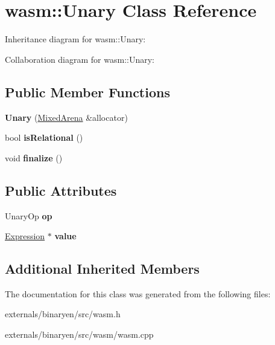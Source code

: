\hypertarget{classwasm_1_1_unary}{}\section{wasm\+:\+:Unary Class Reference}
\label{classwasm_1_1_unary}


Inheritance diagram for wasm\+:\+:Unary\+:


Collaboration diagram for wasm\+:\+:Unary\+:
\subsection*{Public Member Functions}
\begin{DoxyCompactItemize}
\item 
\mbox{\label{classwasm_1_1_unary_add457c6a0247335ef468baee77d86573}} 
{\bfseries Unary} (\mbox{\hyperlink{struct_mixed_arena}{Mixed\+Arena}} \&allocator)
\item 
\mbox{\label{classwasm_1_1_unary_af9d4a97f0adaf689ca49d96e37035aa7}} 
bool {\bfseries is\+Relational} ()
\item 
\mbox{\label{classwasm_1_1_unary_a8e93642e2a57db64a7e3d40c49c4726a}} 
void {\bfseries finalize} ()
\end{DoxyCompactItemize}
\subsection*{Public Attributes}
\begin{DoxyCompactItemize}
\item 
\mbox{\label{classwasm_1_1_unary_a092a131397630a68cc52c71f2816869b}} 
Unary\+Op {\bfseries op}
\item 
\mbox{\label{classwasm_1_1_unary_ad806140427339b569a6734b58b8cf966}} 
\mbox{\hyperlink{classwasm_1_1_expression}{Expression}} $\ast$ {\bfseries value}
\end{DoxyCompactItemize}
\subsection*{Additional Inherited Members}


The documentation for this class was generated from the following files\+:\begin{DoxyCompactItemize}
\item 
externals/binaryen/src/wasm.\+h\item 
externals/binaryen/src/wasm/wasm.\+cpp\end{DoxyCompactItemize}
